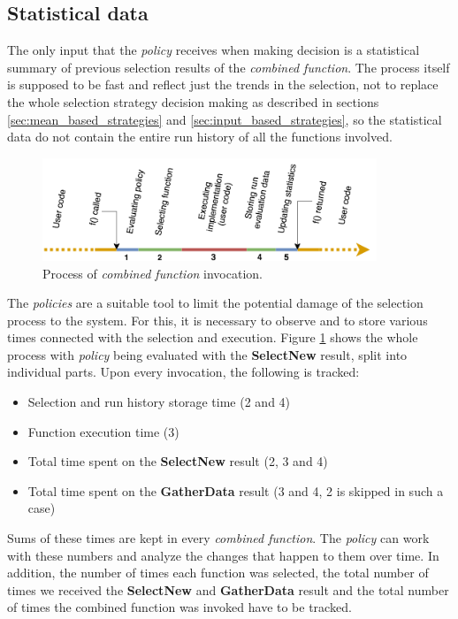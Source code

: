 \subsection{Statistical data}
\label{subsec:statistical_data}

The only input that the \textit{policy} receives when making decision is a statistical summary of previous selection results of the \textit{combined function}. The process itself is supposed to be fast and reflect just the trends in the selection, not to replace the whole selection strategy decision making as described in sections \ref{sec:mean_based_strategies} and \ref{sec:input_based_strategies}, so the statistical data do not contain the entire run history of all the functions involved.

\begin{figure}[h!]
	\captionsetup{justification=centering,margin=0.5cm}
	\centerline{\mbox{\includegraphics[width=100mm]{./img/run_schema.png}}}
	\caption{Process of \textit{combined function} invocation.}
	\label{fig:run_schema}
\end{figure}

The \textit{policies} are a suitable tool to limit the potential damage of the selection process to the system. For this, it is necessary to observe and to store various times connected with the selection and execution. Figure \ref{fig:run_schema} shows the whole process with \textit{policy} being evaluated with the \textbf{SelectNew} result, split into individual parts. Upon every invocation, the following is tracked:

\begin{itemize}
	\item Selection and run history storage time (2 and 4)
	\item Function execution time (3)
	\item Total time spent on the \textbf{SelectNew} result (2, 3 and 4)
	\item Total time spent on the \textbf{GatherData} result (3 and 4, 2 is skipped in such a case)
\end{itemize}

Sums of these times are kept in every \textit{combined function}. The \textit{policy} can work with these numbers and analyze the changes that happen to them over time. In addition, the number of times each function was selected, the total number of times we received the \textbf{SelectNew} and \textbf{GatherData} result and the total number of times the combined function was invoked have to be tracked. 

